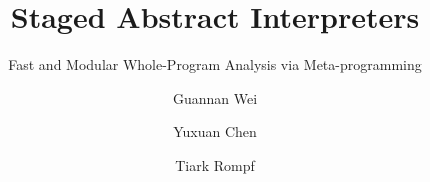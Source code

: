 \documentclass[acmsmall, screen]{acmart}\settopmatter{}
\begin{document}
\title{Staged Abstract Interpreters}         %
\subtitle{Fast and Modular Whole-Program Analysis via Meta-programming}                     %

\iffalse
\author
[Guannan Wei, Yuxuan Chen, Tiark Rompf]
{
\vspace{-2ex}
Guannan Wei, Yuxuan Chen, Tiark Rompf\\
Purdue University
\vspace{-0.5ex}
}
\fi



\author{Guannan Wei}
\author{Yuxuan Chen}
\author{Tiark Rompf}
\end{document}

